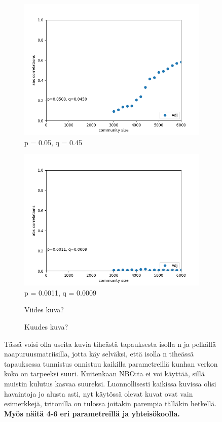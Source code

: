 \documentclass[finnish,12pt,a4paper,pdftex,sci,utf8]{aaltothesis}
\begin{document}
\begin{figure}
\begin{subfigure}{0.3\textwidth}
		\includegraphics[width=\textwidth]{figures/only_adj_3.png}
		\caption{p = 0.05, q = 0.45}
	\end{subfigure}
	
	\begin{subfigure}{0.3\textwidth}
		\centering
		\includegraphics[width=\textwidth]{figures/only_adj_4.png}
		\caption{p = 0.0011, q = 0.0009}
	\end{subfigure}
	\begin{subfigure}{0.3\textwidth}
		\centering
		\caption{Viides kuva?}
	\end{subfigure}
	\begin{subfigure}{0.3\textwidth}
		\centering
		\caption{Kuudes kuva?}
	\end{subfigure}
	\caption{Tässä voisi olla useita kuvia tiheästä tapauksesta isolla n ja pelkällä naapuruusmatriisilla, jotta käy selväksi, että isolla n tiheässä tapauksessa tunnistus onnistuu kaikilla parametreillä kunhan verkon koko on tarpeeksi suuri. Kuitenkaan NBO:ta ei voi käyttää, sillä muistin kulutus kasvaa suureksi. Luonnollisesti kaikissa kuvissa olisi havaintoja jo alusta asti, nyt käytössä olevat kuvat ovat vain esimerkkejä, tritonilla on tulossa joitakin parempia tälläkin hetkellä. \textbf{Myös näitä 4-6 eri parametreillä ja yhteisökoolla.}}
	\label{fig:o_adj_all}
\end{figure}
\end{document}
